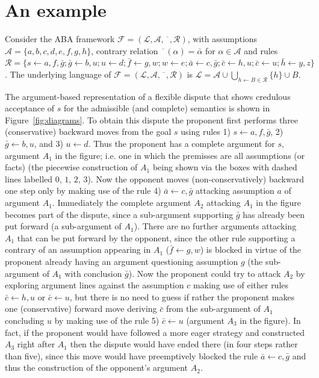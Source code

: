 \documentclass[conference]{IEEEtran}
\newtheorem{example}{Example}[section]
\newcommand{\frF}{\ensuremath{\mathcal{F}}\xspace}
\newcommand{\frL}{\ensuremath{\mathcal{L}}\xspace}
\newcommand{\frA}{\ensuremath{\mathcal{A}}\xspace}
\newcommand{\frCtr}{\ensuremath{\overline{\phantom{x}}}\xspace}
\newcommand{\frR}{\ensuremath{\mathcal{R}}\xspace}
\newcommand{\frTup}{\ensuremath{(\frL,\frA,\frCtr,\frR)}\xspace}
\newcommand{\fr}{\ensuremath{\frF = \frTup}\xspace}
\newcommand{\rulH}{\ensuremath{h}\xspace}
\newcommand{\rulB}{\ensuremath{B}\xspace}
\newcommand{\rul}{\ensuremath{\rulH \leftarrow \rulB}\xspace}
\newcommand{\rulA}[2]{\ensuremath{#1 \leftarrow #2}\xspace}
\begin{document}
\section{An example}



Consider the ABA framework \fr, with assumptions $\frA = \{ a,b,c,d,e,f,g,h \}$, contrary relation $\frCtr(\alpha) = \bar{\alpha}$ for $\alpha \in \frA$ and rules $\frR = \{ \rulA{s}{a,f,\bar{g}}; \rulA{\bar{g}}{b,u}; \rulA{u}{d}; \rulA{\bar{f}}{g,w}; \rulA{w}{e};\rulA{\bar{a}}{c,\bar{g}};\rulA{\bar{c}}{h,u};\rulA{\bar{c}}{u};\rulA{\bar{h}}{y,z} \}$.  The underlying language of \fr is $\frL = \frA \cup \bigcup_{\rul \in \frR} \{ \rulH \} \cup \rulB$. 

The argument-based representation of a flexible dispute that shows credulous acceptance of $s$ for the admissible (and complete) semantics is shown in Figure~\ref{fig:diagrams}. To obtain this dispute the proponent first performs three (conservative) backward moves from the goal $s$ using rules 1) $\rulA{s}{a,f,\bar{g}}$, 2) $\rulA{\bar{g}}{b,u}$, and  3) $\rulA{u}{d}$. Thus the proponent has a complete argument for $s$, argument $A_1$ in the figure; i.e. one in which the premisses are all assumptions (or facts) (the piecewise construction of $A_1$ being shown via the boxes with dashed lines labelled $0$, $1$, $2$, $3$).  Now the opponent moves (non-conservatively) backward one step only by making use of the rule 4) $\rulA{\bar{a}}{c,\bar{g}}$ attacking assumption $a$ of argument $A_1$.  Immediately the complete argument $A_2$ attacking $A_1$ in the figure becomes part of the dispute, since a sub-argument supporting $\bar{g}$ has already been put forward (a sub-argument of $A_1$).  There are no further arguments attacking $A_1$ that can be put forward by the opponent, since the other rule supporting a contrary of an assumption appearing in $A_1$ ($\rulA{\bar{f}}{g,w}$) is blocked in virtue of the proponent already having an argument questioning assumption $g$ (the sub-argument of $A_1$ with conclusion $\bar{g}$).  Now the proponent could try to attack $A_2$ by exploring argument lines against the assumption $c$ making use of either rules $\rulA{\bar{c}}{h,u}$ or $\rulA{\bar{c}}{u}$, but there is no need to guess if rather the proponent makes one (conservative) forward move deriving $\bar{c}$ from the sub-argument of $A_1$ concluding $u$ by making use of the rule 5) $\rulA{\bar{c}}{u}$ (argument $A_3$ in the figure). In fact, if the proponent would have followed a more eager strategy and constructed $A_3$ right after $A_1$ then the dispute would have ended there (in four steps rather than five), since this move would have preemptively blocked the rule $\rulA{\bar{a}}{c,\bar{g}}$ and thus the construction of the opponent's argument $A_2$.   
\end{document}
